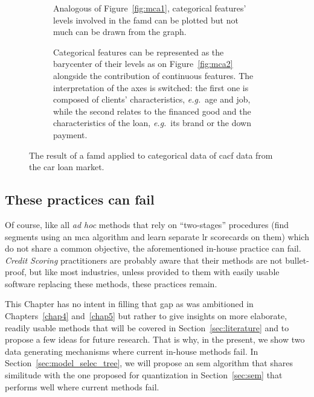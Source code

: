 \begin{figure}[!htb]
{\setlength{\parindent}{0cm}}

\begin{multicols}{2}
\centering
\begin{subfigure}[t]{0.45\textwidth}
\centering
\resizebox{\textwidth}{!}{}
\caption{\label{fig:famd1} Analogous of Figure~\ref{fig:mca1}, categorical features' levels involved in the \gls{famd} can be plotted but not much can be drawn from the graph.}
\end{subfigure}%
\columnbreak
\hspace*{1cm} \begin{subfigure}[t]{0.45\textwidth}
\centering
\resizebox{\textwidth}{!}{}
\caption{\label{fig:famd2} Categorical features can be represented as the barycenter of their levels as on Figure~\ref{fig:mca2} alongside the contribution of continuous features. The interpretation of the axes is switched: the first one is composed of clients' characteristics, \textit{e.g.}\ age and job, while the second relates to the financed good and the characteristics of the loan, \textit{e.g.}\ its brand or the down payment.}
\end{subfigure}
\end{multicols}

\caption{\label{fig:famd} The result of a \gls{famd} applied to categorical data of \gls{cacf} data from the car loan market.}
\end{figure}

\subsection{These practices can fail}

Of course, like all \textit{ad hoc} methods that rely on ``two-stages'' procedures (find segments using an \gls{mca} algorithm and learn separate \gls{lr} scorecards on them) which do not share a common objective, the aforementioned in-house practice can fail. \textit{Credit Scoring} practitioners are probably aware that their methods are not bullet-proof, but like most industries, unless provided to them with easily usable software replacing these methods, these practices remain.

This Chapter has no intent in filling that gap as was ambitioned in Chapters~\ref{chap4} and~\ref{chap5} but rather to give insights on more elaborate, readily usable methods that will be covered in Section~\ref{sec:literature} and to propose a few ideas for future research. That is why, in the present, we show two data generating mechanisms where current in-house methods fail. In Section~\ref{sec:model_selec_tree}, we will propose an \gls{sem} algorithm that shares similitude with the one proposed for quantization in Section~\ref{sec:sem} that performs well where current methods fail.

